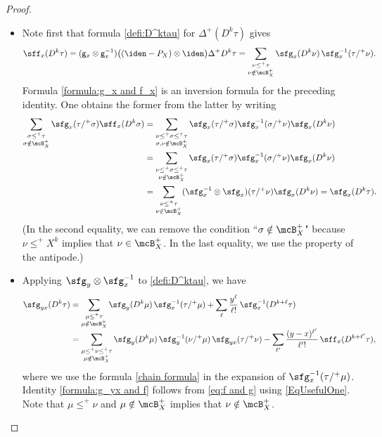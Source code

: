 \begin{proof}
\begin{itemize}
\item
Note first that formula \eqref{defi:D^ktau} for $\Delta^+(D^k\tau)$ gives
\begin{equation} \label{EqUsefulOne}
{\sff}_x(D^k\tau) = ({\sf g}_x\otimes {\sf g}_x^{-1})\bigl((\iden-P_X)\otimes\iden\bigr)\Delta^+D^k\tau = \sum_{\substack{\nu\leq^+\tau\\ \nu\notin\mcB_X^+}} {\sfg}_x(D^k\nu)\,{\sfg}_x^{-1}(\tau/^+\nu).
\end{equation}
Formula \eqref{formula:g_x and f_x} is an inversion formula for the preceding identity. One obtains the former from the latter by writing
\begin{align*}
\sum_{\substack{\sigma\leq^+\tau\\\sigma\notin\mcB_X^+}}\sfg_x(\tau/^+\sigma)\sff_x(D^k\sigma) &= \sum_{\substack{\nu\le^+\sigma\le^+\tau\\\sigma,\nu\notin\mcB_X^+}} \sfg_x(\tau/^+\sigma)\sfg_x^{-1}(\sigma/^+\nu)\sfg_x(D^k\nu) \\
&= \sum_{\substack{\nu\le^+\sigma\le^+\tau\\\nu\notin\mcB_X^+}} \sfg_x(\tau/^+\sigma)\sfg_x^{-1}(\sigma/^+\nu)\sfg_x(D^k\nu) \\
&= \sum_{\substack{\nu\le^+\tau\\\nu\notin\mcB_X^+}}(\sfg_x^{-1}\otimes\sfg_x)(\tau/^+\nu)\sfg_x(D^k\nu)= \sfg_x(D^k\tau).
\end{align*}
(In the second equality, we can remove the condition ``$\sigma\notin\mcB_X^+$" because $\nu\le^+X^k$ implies that $\nu\in\mcB_X^+$. In the last equality, we use the property of the antipode.)

\item
Applying $\sfg_y\otimes\sfg_x^{-1}$ to \eqref{defi:D^ktau}, we have
\begin{align}\label{eq:f and g}
\sfg_{yx}(D^k\tau)
&= \sum_{\substack{\mu\le^+\tau\\\mu\notin\mcB_X^+}} \sfg_y(D^k\mu)\,\sfg_x^{-1}(\tau/^+\mu) + \sum_\ell\frac{y^\ell}{\ell!}\,\sfg_x^{-1}(D^{k+\ell}\tau)\notag \\[-15pt] \\[-5pt]
&= \sum_{\substack{\mu\le^+\nu\le^+\tau\\\mu\notin\mcB_X^+}} \sfg_y(D^k\mu)\,\sfg_y^{-1}(\nu/^+\mu)\,\sfg_{yx}(\tau/^+\nu) - \sum_{\ell'}\frac{(y-x)^{\ell'}}{\ell'!}\,\sff_x(D^{k+\ell'}\tau),\notag
\end{align}
where we use the formula \eqref{chain formula} in the expansion of $\sfg_x^{-1}(\tau/^+\mu)$. Identity \eqref{formula:g_yx and f} follows from \eqref{eq:f and g} using \eqref{EqUsefulOne}. Note that $\mu\le^+\nu$ and $\mu\notin\mcB_X^+$ implies that $\nu\notin\mcB_X^+$.


\end{itemize}
\end{proof}
